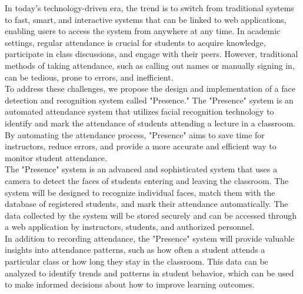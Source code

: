 In today's technology-driven era, the trend is to switch from traditional systems to fast, smart, and interactive systems that can be linked to web applications, enabling users to access the system from anywhere at any time. In academic settings, regular attendance is crucial for students to acquire knowledge, participate in class discussions, and engage with their peers. However, traditional methods of taking attendance, such as calling out names or manually signing in, can be tedious, prone to errors, and inefficient.\\

To address these challenges, we propose the design and implementation of a face detection and recognition system called "Presence." The "Presence" system is an automated attendance system that utilizes facial recognition technology to identify and mark the attendance of students attending a lecture in a classroom. By automating the attendance process, "Presence" aims to save time for instructors, reduce errors, and provide a more accurate and efficient way to monitor student attendance.\\

The "Presence" system is an advanced and sophisticated system that uses a camera to detect the faces of students entering and leaving the classroom. The system will be designed to recognize individual faces, match them with the database of registered students, and mark their attendance automatically. The data collected by the system will be stored securely and can be accessed through a web application by instructors, students, and authorized personnel.\\

In addition to recording attendance, the "Presence" system will provide valuable insights into attendance patterns, such as how often a student attends a particular class or how long they stay in the classroom. This data can be analyzed to identify trends and patterns in student behavior, which can be used to make informed decisions about how to improve learning outcomes.